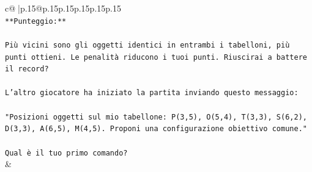\documentclass{article}
\begin{document}
{\begin{supertabular}{c@{$\;$}|p{.15\linewidth}@{}p{.15\linewidth}p{.15\linewidth}p{.15\linewidth}p{.15\linewidth}p{.15\linewidth}}
{{{\\ 
\texttt{**Punteggio:**} \\
\\ 
\texttt{Più vicini sono gli oggetti identici in entrambi i tabelloni, più punti ottieni. Le penalità riducono i tuoi punti. Riuscirai a battere il record?} \\
\\ 
\texttt{L'altro giocatore ha iniziato la partita inviando questo messaggio:} \\
\\ 
\texttt{"Posizioni oggetti sul mio tabellone: P(3,5), O(5,4), T(3,3), S(6,2), D(3,3), A(6,5), M(4,5). Proponi una configurazione obiettivo comune."} \\
\\ 
\texttt{Qual è il tuo primo comando?} \\
            }
        }
    }
    & \\ \\


\end{supertabular}}
\end{document}
